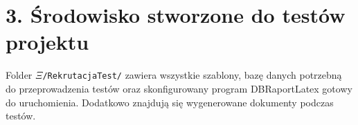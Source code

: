 \documentclass[a4paper,onecolumn,oneside,12pt,wide,floatssmall]{mwrep}
\begin{document}
\section{3. \hspace{1mm}Środowisko stworzone do testów projektu}
\hspace{3mm}  Folder \texttt{$\Xi$/RekrutacjaTest/} zawiera wszystkie szablony, bazę danych potrzebną do przeprowadzenia testów oraz  skonfigurowany program DBRaportLatex gotowy do uruchomienia. Dodatkowo znajdują się wygenerowane dokumenty podczas testów.



%

% 
%
\end{document}
